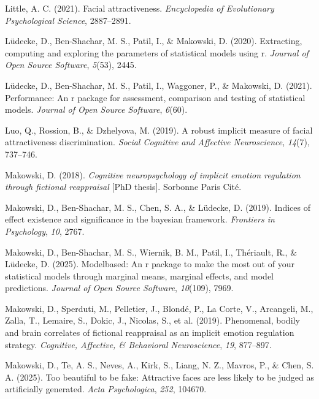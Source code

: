 \documentclass[
  jou,
  floatsintext,
  longtable,
  nolmodern,
  notxfonts,
  notimes,
  colorlinks=true,linkcolor=blue,citecolor=blue,urlcolor=blue]{apa7}
\newlength{\cslhangindent}
\newenvironment{CSLReferences}[2] %
 {\begin{list}{}{%
  \setlength{\itemindent}{0pt}
  \setlength{\leftmargin}{0pt}
  \setlength{\parsep}{0pt}
  \ifodd #1
   \setlength{\leftmargin}{\cslhangindent}
   \setlength{\itemindent}{-1\cslhangindent}
  \fi
  \setlength{\itemsep}{#2\baselineskip}}}
 {\end{list}}
\begin{document}
\begin{CSLReferences}{1}{0}
Little, A. C. (2021). Facial attractiveness. \emph{Encyclopedia of
Evolutionary Psychological Science}, 2887--2891.

Lüdecke, D., Ben-Shachar, M. S., Patil, I., \& Makowski, D. (2020).
Extracting, computing and exploring the parameters of statistical models
using r. \emph{Journal of Open Source Software}, \emph{5}(53), 2445.

Lüdecke, D., Ben-Shachar, M. S., Patil, I., Waggoner, P., \& Makowski,
D. (2021). Performance: An r package for assessment, comparison and
testing of statistical models. \emph{Journal of Open Source Software},
\emph{6}(60).

Luo, Q., Rossion, B., \& Dzhelyova, M. (2019). A robust implicit measure
of facial attractiveness discrimination. \emph{Social Cognitive and
Affective Neuroscience}, \emph{14}(7), 737--746.

Makowski, D. (2018). \emph{Cognitive neuropsychology of implicit emotion
regulation through fictional reappraisal} {[}PhD thesis{]}. Sorbonne
Paris Cit{é}.

Makowski, D., Ben-Shachar, M. S., Chen, S. A., \& Lüdecke, D. (2019).
Indices of effect existence and significance in the bayesian framework.
\emph{Frontiers in Psychology}, \emph{10}, 2767.

Makowski, D., Ben-Shachar, M. S., Wiernik, B. M., Patil, I., Thériault,
R., \& Lüdecke, D. (2025). Modelbased: An r package to make the most out
of your statistical models through marginal means, marginal effects, and
model predictions. \emph{Journal of Open Source Software},
\emph{10}(109), 7969.

Makowski, D., Sperduti, M., Pelletier, J., Blondé, P., La Corte, V.,
Arcangeli, M., Zalla, T., Lemaire, S., Dokic, J., Nicolas, S., et al.
(2019). Phenomenal, bodily and brain correlates of fictional reappraisal
as an implicit emotion regulation strategy. \emph{Cognitive, Affective,
\& Behavioral Neuroscience}, \emph{19}, 877--897.

Makowski, D., Te, A. S., Neves, A., Kirk, S., Liang, N. Z., Mavros, P.,
\& Chen, S. A. (2025). Too beautiful to be fake: Attractive faces are
less likely to be judged as artificially generated. \emph{Acta
Psychologica}, \emph{252}, 104670.


\end{CSLReferences}
\end{document}
